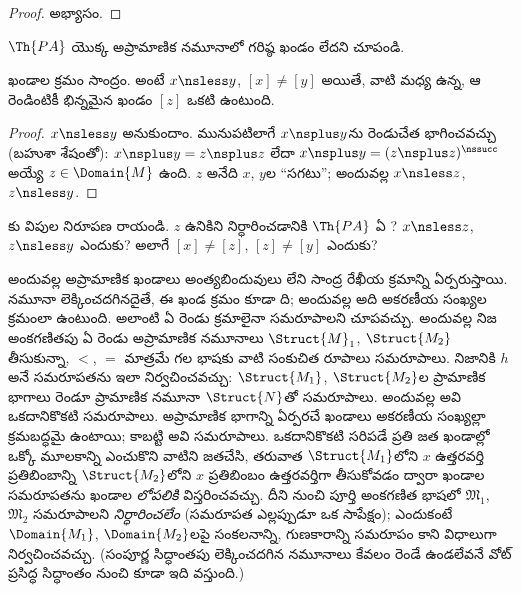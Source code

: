 \documentclass[../../../include/open-logic-section]{subfiles}
\begin{document}
\begin{proof}
అభ్యాసం.
\end{proof}

\begin{prob}
$\Th{PA}$ యొక్క అప్రామాణిక నమూనాలో గరిష్ఠ ఖండం లేదని చూపండి.
\end{prob}

\begin{prop}
ఖండాల క్రమం సాంద్రం. అంటే $x\nsless y$, $[x]\neq[y]$ అయితే,
వాటి మధ్య ఉన్న, ఆ రెండింటికీ భిన్నమైన ఖండం $[z]$ ఒకటి ఉంటుంది.
\end{prop}

\begin{proof}
$x\nsless y$ అనుకుందాం. మునుపటిలాగే $x\nsplus y$ను రెండుచేత
భాగించవచ్చు (బహుశా శేషంతో): $x\nsplus y=z\nsplus z$ లేదా
$x\nsplus y=(z\nsplus z)^\nssucc$ అయ్యే
$z\in\Domain{M}$ ఉంది. $z$ అనేది $x$, $y$ల “సగటు”; అందువల్ల
$x\nsless z$, $z\nsless y$.
\end{proof}

\begin{prob}
కు విపుల నిరూపణ రాయండి.
$z$ ఉనికిని నిర్ధారించడానికి $\Th{PA}$ ఏ
? $x\nsless z$,
$z\nsless y$ ఎందుకు? అలాగే $[x]\neq[z]$, $[z]\neq[y]$ ఎందుకు?
\end{prob}

\begin{explain}
అందువల్ల అప్రామాణిక ఖండాలు అంత్యబిందువులు లేని సాంద్ర రేఖీయ క్రమాన్ని
ఏర్పరుస్తాయి. నమూనా లెక్కించదగినదైతే, ఈ ఖండ క్రమం కూడా
ది; అందువల్ల అది
అకరణీయ సంఖ్యల క్రమంలా ఉంటుంది.
అలాంటి ఏ రెండు
 క్రమాలైనా సమరూపాలని
చూపవచ్చు. అందువల్ల నిజ అంకగణితపు ఏ రెండు
 అప్రామాణిక నమూనాలు
$\Struct{M}_1$, $\Struct{M_2}$ తీసుకున్నా, $<$, $=$ మాత్రమే గల భాషకు
వాటి సంకుచిత రూపాలు సమరూపాలు. నిజానికి $h$ అనే సమరూపతను ఇలా
నిర్వచించవచ్చు: $\Struct{M_1}$, $\Struct{M_2}$ల ప్రామాణిక భాగాలు రెండూ
ప్రామాణిక నమూనా $\Struct{N}$తో సమరూపాలు. అందువల్ల అవి ఒకదానికొకటి సమరూపాలు.
అప్రామాణిక భాగాన్ని ఏర్పరచే ఖండాలు అకరణీయ సంఖ్యల్లా
క్రమబద్ధమై ఉంటాయి; కాబట్టి అవి సమరూపాలు. ఒకదానికొకటి సరిపడే ప్రతి జత ఖండాల్లో ఒక్కో మూలకాన్ని ఎంచుకొని వాటిని జతచేసి, తరువాత $\Struct{M_1}$లోని $x$
ఉత్తరవర్తి ప్రతిబింబాన్ని $\Struct{M_2}$లోని $x$ ప్రతిబింబం
ఉత్తరవర్తిగా తీసుకోవడం ద్వారా ఖండాల సమరూపతను ఖండాల
\emph{లోపలికి} విస్తరించవచ్చు. దీని నుంచి పూర్తి అంకగణిత భాషలో
$\mathfrak{M}_1$, $\mathfrak{M}_2$ సమరూపాలని \emph{నిర్ధారించలేం}
(సమరూపత ఎల్లప్పుడూ ఒక  సాపేక్షం);
ఎందుకంటే $\Domain{M_1}$, $\Domain{M_2}$లపై సంకలనాన్ని, గుణకారాన్ని
సమరూపం కాని విధాలుగా నిర్వచించవచ్చు. (సంపూర్ణ సిద్ధాంతపు లెక్కించదగిన
నమూనాలు కేవలం రెండే ఉండలేవనే వోట్ ప్రసిద్ధ సిద్ధాంతం నుంచి కూడా ఇది
వస్తుంది.)
\end{explain}
\end{document}
